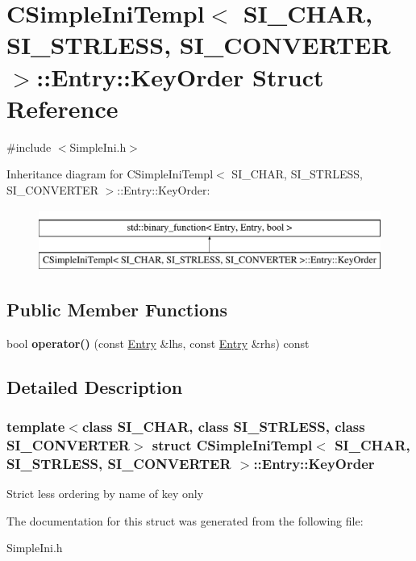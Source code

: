 \hypertarget{a00882}{}\section{C\+Simple\+Ini\+Templ$<$ S\+I\+\_\+\+C\+H\+AR, S\+I\+\_\+\+S\+T\+R\+L\+E\+SS, S\+I\+\_\+\+C\+O\+N\+V\+E\+R\+T\+ER $>$\+:\+:Entry\+:\+:Key\+Order Struct Reference}
\label{a00882}


{\ttfamily \#include $<$Simple\+Ini.\+h$>$}

Inheritance diagram for C\+Simple\+Ini\+Templ$<$ S\+I\+\_\+\+C\+H\+AR, S\+I\+\_\+\+S\+T\+R\+L\+E\+SS, S\+I\+\_\+\+C\+O\+N\+V\+E\+R\+T\+ER $>$\+:\+:Entry\+:\+:Key\+Order\+:\begin{figure}[H]
\begin{center}
\leavevmode
\includegraphics[height=2.000000cm]{a00882}
\end{center}
\end{figure}
\subsection*{Public Member Functions}
\begin{DoxyCompactItemize}
\item 
\mbox{\label{a00882_a402ee4ace1311daeaa0eae6c4c83bf87}} 
bool {\bfseries operator()} (const \hyperlink{a00878}{Entry} \&lhs, const \hyperlink{a00878}{Entry} \&rhs) const
\end{DoxyCompactItemize}


\subsection{Detailed Description}
\subsubsection*{template$<$class S\+I\+\_\+\+C\+H\+AR, class S\+I\+\_\+\+S\+T\+R\+L\+E\+SS, class S\+I\+\_\+\+C\+O\+N\+V\+E\+R\+T\+ER$>$\newline
struct C\+Simple\+Ini\+Templ$<$ S\+I\+\_\+\+C\+H\+A\+R, S\+I\+\_\+\+S\+T\+R\+L\+E\+S\+S, S\+I\+\_\+\+C\+O\+N\+V\+E\+R\+T\+E\+R $>$\+::\+Entry\+::\+Key\+Order}

Strict less ordering by name of key only 

The documentation for this struct was generated from the following file\+:\begin{DoxyCompactItemize}
\item 
Simple\+Ini.\+h\end{DoxyCompactItemize}
